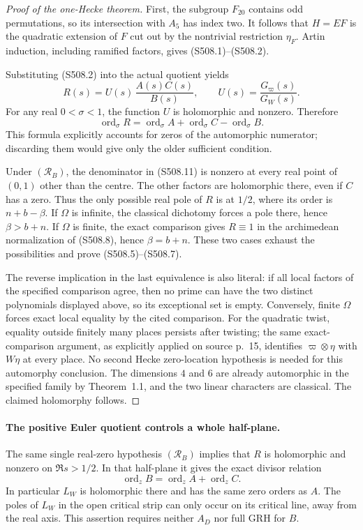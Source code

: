\begin{proof}[Proof of the one-Hecke theorem]
First, the subgroup $F_{20}$ contains odd permutations, so
its intersection with $A_5$ has index two.  It follows that
$H=EF$ is the quadratic extension of $F$ cut out by the
nontrivial restriction $\eta_F$.  Artin induction, including
ramified factors, gives (S508.1)--(S508.2).

Substituting (S508.2) into the actual quotient yields
\[
          R(s)=U(s)\,\frac{A(s)C(s)}{B(s)},\qquad
          U(s)=\frac{G_{\varpi}(s)}{G_W(s)}.
 \tag{S508.11}
\]
For any real $0<\sigma<1$, the function $U$ is holomorphic
and nonzero.  Therefore
\[
 \operatorname{ord}_{\sigma}R
   =\operatorname{ord}_{\sigma}A
     +\operatorname{ord}_{\sigma}C
     -\operatorname{ord}_{\sigma}B.
 \tag{S508.12}
\]
This formula explicitly accounts for zeros of the automorphic
numerator; discarding them would give only the older sufficient
condition.

Under $(\mathcal R_B)$, the denominator in (S508.11) is nonzero
at every real point of $(0,1)$ other than the centre.
The other factors are holomorphic there, even if $C$ has a
zero.  Thus the only possible real pole of $R$ is at $1/2$,
where its order is $n+b-\beta$.
If $\Omega$ is infinite, the classical dichotomy forces a pole
there, hence $\beta>b+n$.  If $\Omega$ is finite, the exact
comparison gives $R\equiv1$ in the archimedean normalization
of (S508.8), hence $\beta=b+n$.  These two cases exhaust the
possibilities and prove (S508.5)--(S508.7).

The reverse implication in the last equivalence is also literal:
if all local factors of the specified comparison agree, then
no prime can have the two distinct polynomials displayed above,
so its exceptional set is empty.  Conversely, finite $\Omega$
forces exact local equality by the cited comparison.
For the quadratic twist, equality outside finitely many places
persists after twisting; the same exact-comparison argument,
as explicitly applied on source p.~15, identifies
$\varpi\otimes\eta$ with $W\eta$ at every place.  No second
Hecke zero-location hypothesis is needed for this automorphy
conclusion.  The dimensions $4$ and $6$ are already automorphic
in the specified family by Theorem~1.1, and the two linear
characters are classical.  The claimed holomorphy follows.
\end{proof}

\paragraph{The positive Euler quotient controls a whole half-plane.}
The same single real-zero hypothesis $(\mathcal R_B)$ implies
that $R$ is holomorphic and nonzero on $\Re s>1/2$.
In that half-plane it gives the exact divisor relation
\[
        \operatorname{ord}_z B
             =\operatorname{ord}_z A+\operatorname{ord}_z C.
 \tag{S508.13}
\]
In particular $L_W$ is holomorphic there and has the same
zero orders as $A$.  The poles of $L_W$ in the open critical
strip can only occur on its critical line, away from the real
axis.  This assertion requires neither $A_D$ nor full GRH for $B$.

